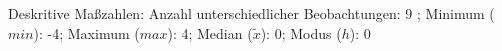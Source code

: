 				\label{tableValues:cski02d}
				\vspace*{-\baselineskip}
                    \begin{noten}
                	    \note{} Deskritive Maßzahlen:
                	    Anzahl unterschiedlicher Beobachtungen: 9%
                	    ; 
                	      Minimum ($min$): -4; 
                	      Maximum ($max$): 4; 
                	      Median ($\tilde{x}$): 0; 
                	      Modus ($h$): 0
                     \end{noten}


